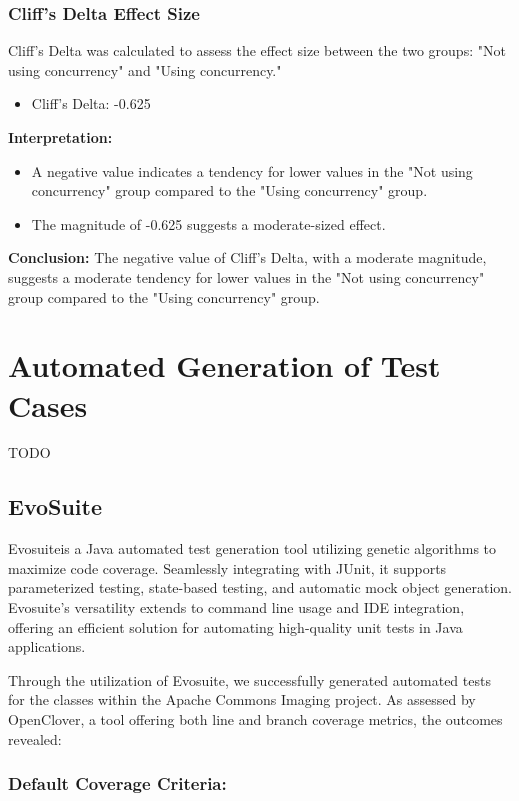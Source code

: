 \documentclass[sigconf]{acmart}
\begin{document}
\subsubsection{Cliff's Delta Effect Size}

Cliff's Delta was calculated to assess the effect size between the two groups: "Not using concurrency" and "Using concurrency."

\begin{itemize}
    \item Cliff's Delta: -0.625
\end{itemize}

\textbf{Interpretation:}
\begin{itemize}
    \item A negative value indicates a tendency for lower values in the "Not using concurrency" group compared to the "Using concurrency" group.
    \item The magnitude of -0.625 suggests a moderate-sized effect.
\end{itemize}

\textbf{Conclusion:}
The negative value of Cliff's Delta, with a moderate magnitude, suggests a moderate tendency for lower values in the "Not using concurrency" group compared to the "Using concurrency" group.



\section{Automated Generation of Test Cases}
TODO

\subsection{EvoSuite}
Evosuite\cite{evosuite}is a Java automated test generation tool utilizing genetic algorithms to maximize code coverage. Seamlessly integrating with JUnit, it supports parameterized testing, state-based testing, and automatic mock object generation. Evosuite's versatility extends to command line usage and IDE integration, offering an efficient solution for automating high-quality unit tests in Java applications.

Through the utilization of Evosuite, we successfully generated automated tests for the classes within the Apache Commons Imaging project. As assessed by OpenClover, a tool offering both line and branch coverage metrics, the outcomes revealed:

\subsubsection{\textbf{Default Coverage Criteria:}}
\end{document}
